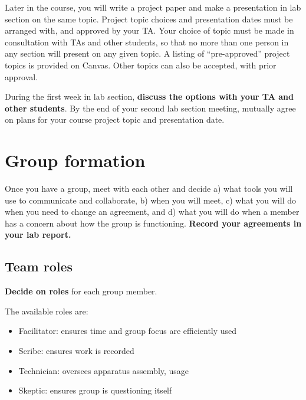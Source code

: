 Later in the course, you will write a project paper and make a presentation in lab section  on the same topic.  Project topic choices and presentation dates must be arranged with, and approved by your TA. Your choice of topic must be made in consultation with TAs and other students, so that no more than one person in any section will present on any given topic. A listing 
of ``pre-approved'' project topics is provided on Canvas. Other topics can also be accepted, with prior approval.

During the first week in lab section, \textbf{discuss the options with your TA and other students}.  By the end of your  second  lab section meeting, mutually agree on plans for your course project topic and presentation date.

\section{Group formation}

\begin{steps}
	\item Once you have a group, meet with each other and decide a) what tools you will use to communicate and collaborate, b) when you will meet, c) what you will do when you need to change an agreement, and d) what you will do when a member has a concern about how the group is functioning. \textbf{Record your agreements in your lab report.} %
\end{steps}

\subsection{Team roles}

\begin{steps}
\item \textbf{Decide on roles} for each group member.
\end{steps}

The available roles are:

\begin{itemize}
\item Facilitator: ensures time and group focus are efficiently used
\item Scribe: ensures work is recorded
\item Technician: oversees apparatus assembly, usage
\item Skeptic: ensures group is questioning itself
\end{itemize}

